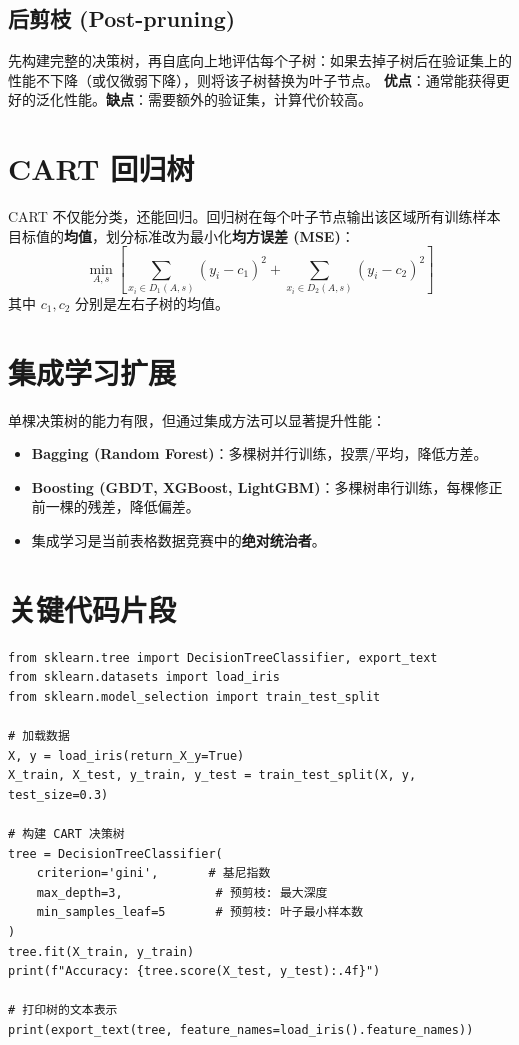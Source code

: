 \documentclass[12pt, a4paper]{book}
\begin{document}
\subsection{后剪枝 (Post-pruning)}
先构建完整的决策树，再自底向上地评估每个子树：如果去掉子树后在验证集上的性能不下降（或仅微弱下降），则将该子树替换为叶子节点。
\textbf{优点}：通常能获得更好的泛化性能。\textbf{缺点}：需要额外的验证集，计算代价较高。

\section{CART 回归树}
CART 不仅能分类，还能回归。回归树在每个叶子节点输出该区域所有训练样本目标值的\textbf{均值}，划分标准改为最小化\textbf{均方误差 (MSE)}：
$$ \min_{A, s} \left[ \sum_{x_i \in D_1(A,s)} (y_i - c_1)^2 + \sum_{x_i \in D_2(A,s)} (y_i - c_2)^2 \right] $$
其中 $c_1, c_2$ 分别是左右子树的均值。

\section{集成学习扩展}
单棵决策树的能力有限，但通过集成方法可以显著提升性能：
\begin{itemize}
    \item \textbf{Bagging (Random Forest)}：多棵树并行训练，投票/平均，降低方差。
    \item \textbf{Boosting (GBDT, XGBoost, LightGBM)}：多棵树串行训练，每棵修正前一棵的残差，降低偏差。
    \item 集成学习是当前表格数据竞赛中的\textbf{绝对统治者}。
\end{itemize}

\section{关键代码片段}
\begin{lstlisting}
from sklearn.tree import DecisionTreeClassifier, export_text
from sklearn.datasets import load_iris
from sklearn.model_selection import train_test_split

# 加载数据
X, y = load_iris(return_X_y=True)
X_train, X_test, y_train, y_test = train_test_split(X, y, test_size=0.3)

# 构建 CART 决策树
tree = DecisionTreeClassifier(
    criterion='gini',       # 基尼指数
    max_depth=3,             # 预剪枝: 最大深度
    min_samples_leaf=5       # 预剪枝: 叶子最小样本数
)
tree.fit(X_train, y_train)
print(f"Accuracy: {tree.score(X_test, y_test):.4f}")

# 打印树的文本表示
print(export_text(tree, feature_names=load_iris().feature_names))
\end{lstlisting}
\end{document}
